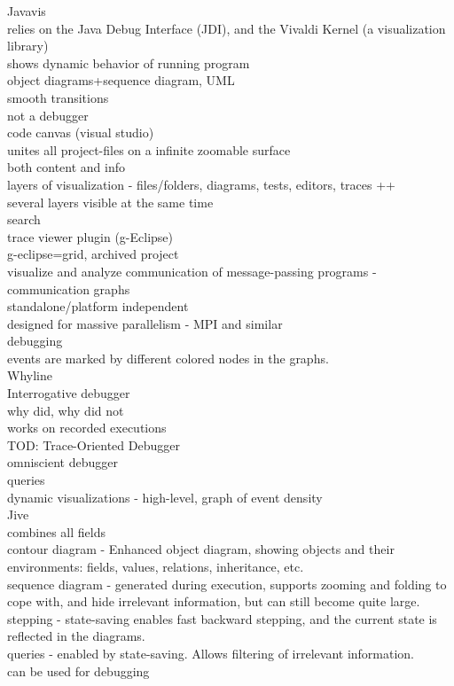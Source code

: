 Javavis\\
	relies on the Java Debug Interface (JDI), and the Vivaldi Kernel (a visualization library)\\
	shows dynamic behavior of running program\\
	object diagrams+sequence diagram, UML\\
	smooth transitions\\
	not a debugger\\
	
code canvas (visual studio)\\%
	unites all project-files on a infinite zoomable surface\\
	both content and info\\
	layers of visualization - files/folders, diagrams, tests, editors, traces ++\\
	several layers visible at the same time\\
	search\\

trace viewer plugin (g-Eclipse)\\%
	g-eclipse=grid, archived project\\
	visualize and analyze communication of message-passing programs - communication graphs\\
	standalone/platform independent\\
	designed for massive parallelism - MPI and similar\\
	debugging\\
	events are marked by different colored nodes in the graphs.\\

Whyline\\%
	Interrogative debugger\\
	why did, why did not\\
	works on recorded executions\\

TOD: Trace-Oriented Debugger\\%
	omniscient debugger\\
	queries\\
	dynamic visualizations - high-level, graph of event density\\

Jive\\%
	combines all fields\\
	contour diagram - Enhanced object diagram, showing objects and their environments: fields, values, relations, inheritance, etc.\\
	sequence diagram - generated during execution, supports zooming and folding to cope with, and hide irrelevant information, but can still become quite large.\\
	stepping - state-saving enables fast backward stepping, and the current state is reflected in the diagrams.\\
	queries - enabled by state-saving. Allows filtering of irrelevant information.\\
	can be used for debugging\\




